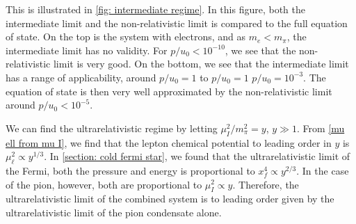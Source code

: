 This is illustrated in \autoref{fig: intermediate regime}.
In this figure, both the intermediate limit and the non-relativistic limit is compared to the full equation of state.
On the top is the system with electrons, and as $m_e < m_\pi$, the intermediate limit has no validity.
For $p/u_0 < 10^{-10}$, we see that the non-relativistic limit is very good.
On the bottom, we see that the intermediate limit has a range of applicability, around $p/u_0 = 1$ to $p/u_0 = 1$ $p/u_0 = 10^{-3}$.
The equation of state is then very well approximated by the non-relativistic limit around $p/u_0 < 10^{-5}$.
 
We can find the ultrarelativistic regime by letting $\mu_I^2/m_\pi^2 = y$, $y \gg 1$.
From \autoref{mu ell from mu I}, we find that the lepton chemical potential to leading order in $y$ is $\mu_\ell^2 \propto y^{1/3}$.
In \autoref{section: cold fermi star}, we found that the ultrarelativistic limit of the Fermi, both the pressure and energy is proportional to $x_f^4 \propto y^{2/3}$.
In the case of the pion, however, both are proportional to $\mu_I^2 \propto y$.
Therefore, the ultrarelativistic limit of the combined system is to leading order given by the ultrarelativistic limit of the pion condensate alone.

